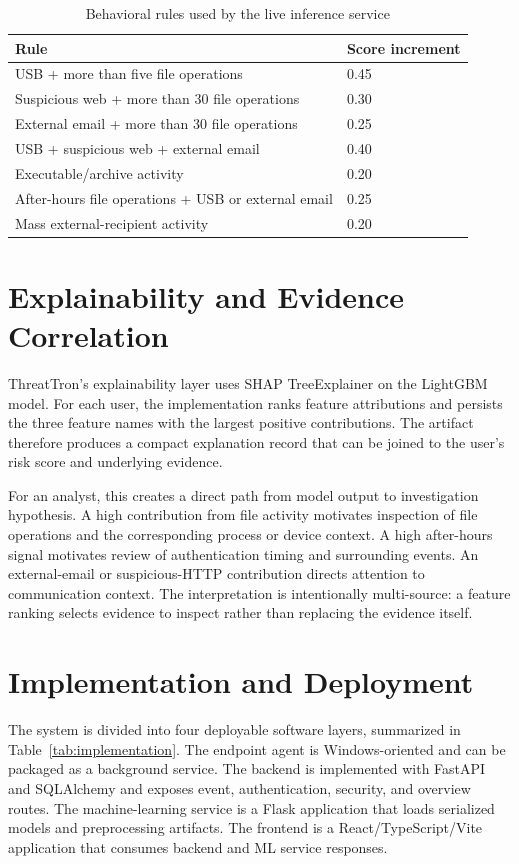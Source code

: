 \begin{table}[t]
\caption{Behavioral rules used by the live inference service}
\label{tab:rules}
\centering
\footnotesize
\begin{tabular}{p{}p{}}
\toprule
Rule & Score increment \\
\midrule
USB + more than five file operations & 0.45 \\
Suspicious web + more than 30 file operations & 0.30 \\
External email + more than 30 file operations & 0.25 \\
USB + suspicious web + external email & 0.40 \\
Executable/archive activity & 0.20 \\
After-hours file operations + USB or external email & 0.25 \\
Mass external-recipient activity & 0.20 \\
\bottomrule
\end{tabular}
\end{table}

\section{Explainability and Evidence Correlation}
ThreatTron's explainability layer uses SHAP TreeExplainer on the LightGBM model. For each user, the implementation ranks feature attributions and persists the three feature names with the largest positive contributions. The artifact therefore produces a compact explanation record that can be joined to the user's risk score and underlying evidence.

For an analyst, this creates a direct path from model output to investigation hypothesis. A high contribution from file activity motivates inspection of file operations and the corresponding process or device context. A high after-hours signal motivates review of authentication timing and surrounding events. An external-email or suspicious-HTTP contribution directs attention to communication context. The interpretation is intentionally multi-source: a feature ranking selects evidence to inspect rather than replacing the evidence itself.

\section{Implementation and Deployment}
The system is divided into four deployable software layers, summarized in Table~\ref{tab:implementation}. The endpoint agent is Windows-oriented and can be packaged as a background service. The backend is implemented with FastAPI and SQLAlchemy and exposes event, authentication, security, and overview routes. The machine-learning service is a Flask application that loads serialized models and preprocessing artifacts. The frontend is a React/TypeScript/Vite application that consumes backend and ML service responses.

